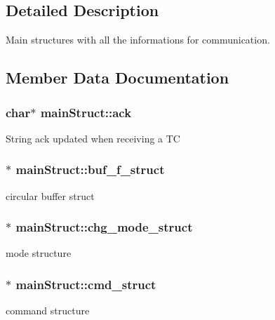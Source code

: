 \subsection{Detailed Description}
Main structures with all the informations for communication. 

\subsection{Member Data Documentation}
\subsubsection[{\texorpdfstring{ack}{ack}}]{\setlength{\rightskip}{0pt plus 5cm}char$\ast$ main\+Struct\+::ack}\hypertarget{structmainStruct_a9060d9925b2aaf971e3e073c6fbf3d24}{}\label{structmainStruct_a9060d9925b2aaf971e3e073c6fbf3d24}
String ack updated when receiving a TC 
\subsubsection[{\texorpdfstring{buf\+\_\+f\+\_\+struct}{buf_f_struct}}]{$\ast$ main\+Struct\+::buf\+\_\+f\+\_\+struct}\hypertarget{structmainStruct_a4ebcee9ad1aa4da7b1cd4c840becc426}{}\label{structmainStruct_a4ebcee9ad1aa4da7b1cd4c840becc426}
circular buffer struct 
\subsubsection[{\texorpdfstring{chg\+\_\+mode\+\_\+struct}{chg_mode_struct}}]{$\ast$ main\+Struct\+::chg\+\_\+mode\+\_\+struct}\hypertarget{structmainStruct_a8e3f3e22c2604451e25751ae03f9dcfe}{}\label{structmainStruct_a8e3f3e22c2604451e25751ae03f9dcfe}
mode structure 
\subsubsection[{\texorpdfstring{cmd\+\_\+struct}{cmd_struct}}]{$\ast$ main\+Struct\+::cmd\+\_\+struct}\hypertarget{structmainStruct_a17c0f6539b8790947410cfd943bfa000}{}\label{structmainStruct_a17c0f6539b8790947410cfd943bfa000}
command structure 
